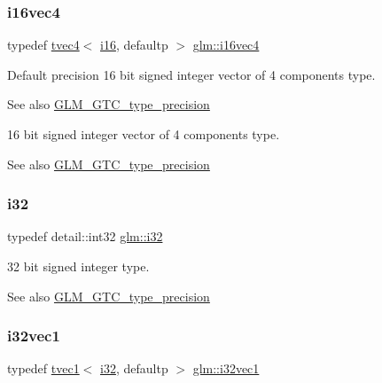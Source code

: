\subsubsection{\texorpdfstring{i16vec4}{i16vec4}}
{\footnotesize\ttfamily typedef \hyperlink{structglm_1_1tvec4}{tvec4}$<$ \hyperlink{group__gtc__type__precision_ga35e5542ca05b29cc256fdafb8503d1fd}{i16}, defaultp $>$ \hyperlink{group__gtc__type__precision_gaf074450c0e60b45114084b1df4012a1d}{glm\+::i16vec4}}

Default precision 16 bit signed integer vector of 4 components type. \begin{DoxySeeAlso}{See also}
\hyperlink{group__gtc__type__precision}{G\+L\+M\+\_\+\+G\+T\+C\+\_\+type\+\_\+precision}
\end{DoxySeeAlso}
16 bit signed integer vector of 4 components type. \begin{DoxySeeAlso}{See also}
\hyperlink{group__gtc__type__precision}{G\+L\+M\+\_\+\+G\+T\+C\+\_\+type\+\_\+precision} 
\end{DoxySeeAlso}
\mbox{\label{group__gtc__type__precision_ga1d8ed5c43e91ea7d4528389da4fa9524}} 
\subsubsection{\texorpdfstring{i32}{i32}}
{\footnotesize\ttfamily typedef detail\+::int32 \hyperlink{group__gtc__type__precision_ga1d8ed5c43e91ea7d4528389da4fa9524}{glm\+::i32}}

32 bit signed integer type. \begin{DoxySeeAlso}{See also}
\hyperlink{group__gtc__type__precision}{G\+L\+M\+\_\+\+G\+T\+C\+\_\+type\+\_\+precision} 
\end{DoxySeeAlso}
\mbox{\label{group__gtc__type__precision_ga05a766bbe2ad0791ed0081baac492da7}} 
\subsubsection{\texorpdfstring{i32vec1}{i32vec1}}
{\footnotesize\ttfamily typedef \hyperlink{structglm_1_1tvec1}{tvec1}$<$ \hyperlink{group__gtc__type__precision_ga1d8ed5c43e91ea7d4528389da4fa9524}{i32}, defaultp $>$ \hyperlink{group__gtc__type__precision_ga05a766bbe2ad0791ed0081baac492da7}{glm\+::i32vec1}}

